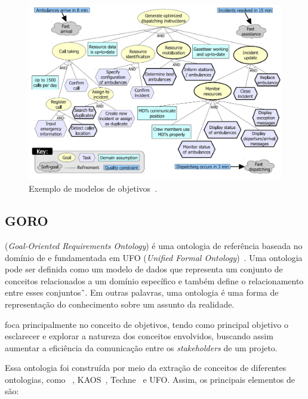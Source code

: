 \begin{figure}
	\centering
	\includegraphics[width=1\textwidth]{figuras/modelos/ACAD-Simples.png}
	\caption{Exemplo de modelos de objetivos~\cite{tesevitor}.}
	\label{figura-acad-simples}
\end{figure}

\subsection{GORO}
\label{sec-referencia-engenharia-objetivos-goro}
\goro (\textit{Goal-Oriented Requirements Ontology}) é uma ontologia de referência baseada no domínio de \gore e fundamentada em UFO (\textit{Unified Formal Ontology})~\cite{guizzardi2005ontological}. Uma ontologia pode ser definida como um modelo de dados que representa um conjunto de conceitos relacionados a um domínio específico e também define o relacionamento entre esses conjuntos˜\cite{gruber2009ontology}. Em outras palavras, uma ontologia é uma forma de representação do conhecimento sobre um assunto da realidade. 

\goro foca principalmente no conceito de objetivos, tendo como principal objetivo o esclarecer e explorar a natureza dos conceitos envolvidos, buscando assim aumentar a eficiência da comunicação entre os \textit{stakeholders} de um projeto. 

Essa ontologia foi construída por meio da extração de conceitos de diferentes ontologias, como \istar~\cite{dalpiaz2016istar}, KAOS~\cite{dardenne1993goal}, Techne~\cite{borgida2009techne} e UFO. Assim, os principais elementos de \goro são:


